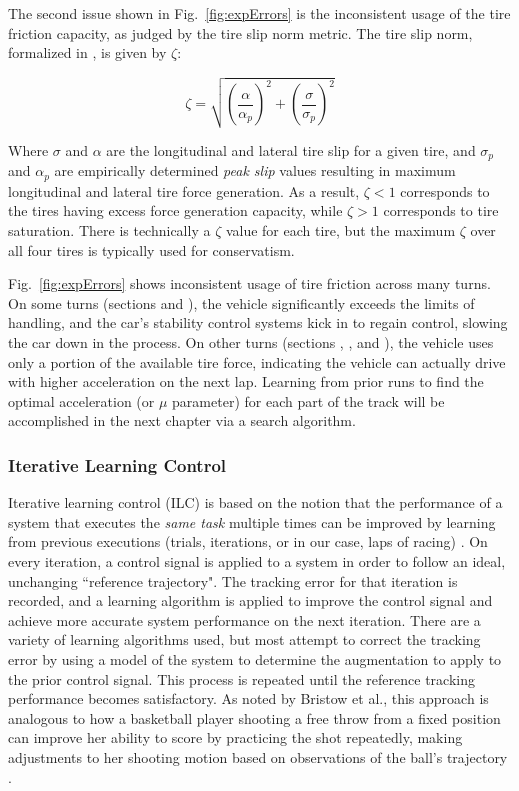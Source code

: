 The second issue shown in Fig.~\ref{fig:expErrors} is the inconsistent usage of the tire friction capacity, as judged by the tire slip norm metric.
The tire slip norm, formalized in \cite{mickthesis}, is given by $\zeta$:

\begin{equation}
\label{eq:zeta}
\zeta = \sqrt{\left(\dfrac{\alpha}{\alpha_{p}}\right)^2 + \left(\dfrac{\sigma}{\sigma_p}\right)^2}
\end{equation}

Where $\sigma$ and $\alpha$ are the longitudinal and lateral tire slip for a given tire, and $\sigma_p$ and $\alpha_p$ are empirically
determined \textit{peak slip} values resulting in maximum longitudinal and lateral tire force generation. As a result, $\zeta < 1 $ corresponds to the tires having
excess force generation capacity, while $\zeta > 1$ corresponds to tire saturation. There is technically a $\zeta$ value for each tire, but the maximum
$\zeta$ over all four tires is typically used for conservatism. 

Fig.~\ref{fig:expErrors} shows inconsistent usage of tire friction across many turns. On some turns (sections  and ), the vehicle significantly exceeds
the limits of handling, and the car's stability control systems kick in to regain control, slowing the car down in the process. On other turns (sections , , and ),
the vehicle uses only a portion of the available tire force, indicating the vehicle can actually drive with higher acceleration on the next lap. 
Learning from prior runs to find the optimal acceleration (or $\mu$ parameter) for each part of the track will be accomplished in the next chapter via a search algorithm. 

\subsubsection{Iterative Learning Control}

Iterative learning control (ILC) is based on the notion that the performance of a system that executes the
\textit{same task} multiple times can be improved by learning from previous executions (trials, iterations, or in our case, laps of racing) \cite{bristow}.
On every iteration, a control signal is applied to a system in order to follow an ideal, unchanging ``reference trajectory". 
The tracking error for that iteration is recorded, and a learning algorithm is applied to improve the control signal and achieve
more accurate system performance on the next iteration. There are a variety of learning algorithms used, but most attempt to correct the tracking
error by using a model of the system to determine the augmentation to apply to the prior control signal. This process is repeated until the reference tracking performance becomes satisfactory.
As noted by Bristow et al., this approach is analogous to how a basketball player shooting a free throw from a fixed position can improve her ability to
score by practicing the shot repeatedly, making adjustments to her shooting motion based on observations of the ball's trajectory \cite{bristow}.

